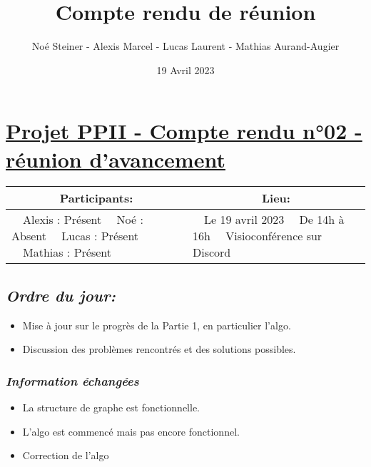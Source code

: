 \documentclass[french,a4paper]{article}
\author{Noé Steiner - Alexis Marcel - Lucas Laurent - Mathias Aurand-Augier}
\date{19 Avril 2023}
\newcommand{\tabitem}{\textbullet~~}\title{Compte rendu de réunion}
\begin{document}
\maketitle

\section*{\underline{Projet PPII - Compte rendu n°02 - réunion d'avancement}}

\begin{table}[!htb]
  \centering
  \begin{tabular}{| p{7cm} | p{7cm} |}
    \hline
    \multicolumn{1}{|c|}{ Participants:} & \multicolumn{1}{c|}{Lieu:} \\
    \hline
    \tabitem Alexis : Présent\newline
    \tabitem Noé : Absent\newline
    \tabitem Lucas : Présent\newline
    \tabitem Mathias : Présent                      &
    \tabitem Le 19 avril 2023\newline
    \tabitem De 14h à 16h\newline
    \tabitem Visioconférence sur Discord                                         \\
    \hline
  \end{tabular}
\end{table}

\subsection*{\textit{Ordre du jour:}}

\begin{itemize}
  \item Mise à jour sur le progrès de la Partie 1, en particulier l'algo.
  \item Discussion des problèmes rencontrés et des solutions possibles.
\end{itemize}

\subsubsection*{\textit{Information échangées}}
\begin{itemize}
  \item La structure de graphe est fonctionnelle.
  \item L'algo est commencé mais pas encore fonctionnel.
  \item Correction de l'algo
\end{itemize}
\end{document}
